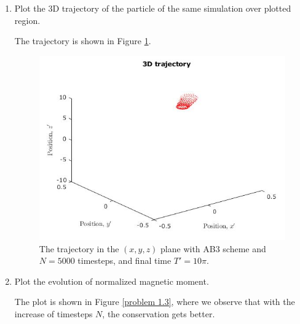 \documentclass{article}
\begin{document}
\begin{enumerate}
\begin{enumerate}
\item
Plot the 3D trajectory of the particle of the same simulation over plotted region.

The trajectory is shown in Figure \ref{problem 1.2}.
\begin{figure}[h]
\centering
\vbox{
\includegraphics[scale=0.4]{problem4a/trajectory_3d_5000.jpg}
}
\caption{The trajectory in the $(x, y, z)$ plane with AB3 scheme and $N=5000$ timesteps, and final time $T' = 10\pi$.}
\label{problem 1.2}
\end{figure}

\item Plot the evolution of normalized magnetic moment.

The plot is shown in Figure \ref{problem 1.3}, where we observe that with the increase of timesteps $N$, the conservation gets better.


\end{enumerate}
\end{enumerate}
\end{document}
